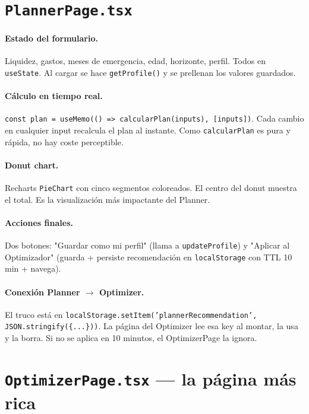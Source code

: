 \documentclass[11pt,a4paper]{book}
\begin{document}
\section{\texttt{PlannerPage.tsx}}

\paragraph{Estado del formulario.} Liquidez, gastos, meses de emergencia, edad, horizonte, perfil. Todos en \texttt{useState}. Al cargar se hace \texttt{getProfile()} y se prellenan los valores guardados.

\paragraph{Cálculo en tiempo real.} \texttt{const plan = useMemo(() => calcularPlan(inputs), [inputs])}. Cada cambio en cualquier input recalcula el plan al instante. Como \texttt{calcularPlan} es pura y rápida, no hay coste perceptible.

\paragraph{Donut chart.} Recharts \texttt{PieChart} con cinco segmentos coloreados. El centro del donut muestra el total. Es la visualización más impactante del Planner.

\paragraph{Acciones finales.} Dos botones: "Guardar como mi perfil" (llama a \texttt{updateProfile}) y "Aplicar al Optimizador" (guarda + persiste recomendación en \texttt{localStorage} con TTL 10 min + navega).

\paragraph{Conexión Planner $\to$ Optimizer.} El truco está en \texttt{localStorage.setItem('plannerRecommendation', JSON.stringify(\{...\}))}. La página del Optimizer lee esa key al montar, la usa y la borra. Si no se aplica en 10 minutos, el OptimizerPage la ignora.

\section{\texttt{OptimizerPage.tsx} --- la página más rica}
\end{document}
